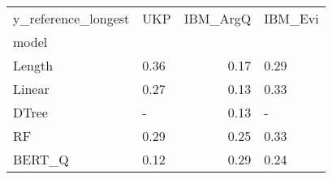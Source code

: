 \begin{tabular}{llrl}
\toprule
y\_reference\_longest &   UKP &  IBM\_ArgQ & IBM\_Evi \\
model  &       &           &         \\
\midrule
Length &  0.36 &      0.17 &    0.29 \\
Linear &  0.27 &      0.13 &    0.33 \\
DTree  &     - &      0.13 &       - \\
RF     &  0.29 &      0.25 &    0.33 \\
BERT\_Q &  0.12 &      0.29 &    0.24 \\
\bottomrule
\end{tabular}
